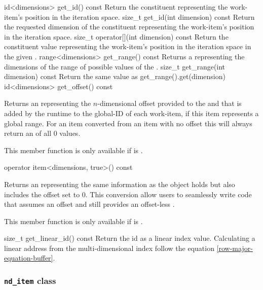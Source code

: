   \addRow
    {id<dimensions> get_id() const}
    {
        Return the constituent 
        representing the work-item's position in the iteration space.
    }
  \addRow
    {size_t get_id(int dimension) const}
    {
      Return the requested dimension of the constituent 
      representing the work-item's position in the iteration space.
    }
  \addRow
    {size_t operator[](int dimension) const}
    {
      Return the constituent  value representing the
      work-item's position in the iteration space in the given
      .
    }
  \addRow
    {range<dimensions> get_range() const}
    {
      Returns a  representing the dimensions of the
      range of possible values of the .
    }
  \addRow
    {size_t get_range(int dimension) const}
    {
      Return the same value as get_range().get(dimension)
    }
  \addRow
    {id<dimensions> get_offset() const}
    {
      Returns an  representing the $n$-dimensional offset
      provided to the  and that is added by
      the runtime to the global-ID of each work-item, if this item
      represents a global range. For an item converted from an item with
      no offset this will always return an  of all 0 values.

      This member function is only available if  is .
    }
  \addRow
    {operator item<dimensions, true>() const}
    {
      Returns an  representing the same information as the object holds
      but also includes the offset set to 0. This conversion allow users to seamlessly
      write code that assumes an offset and still provides an offset-less .

      This member function is only available if  is .
    }
  \addRow
    {size_t get_linear_id() const}
    {
        Return the id as a linear index value. Calculating a linear
        address from the multi-dimensional index follow the equation 
  \ref{row-major-equation-buffer}.
    }
 \completeTable


\subsubsection{\texttt{nd_item} class}
\label{nditem-class}

